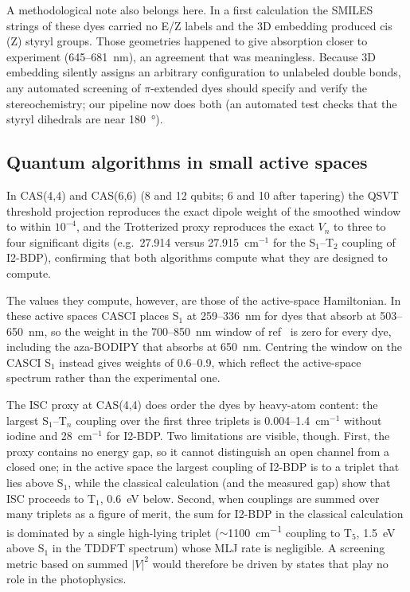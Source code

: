 \documentclass[journal=jpcafh,manuscript=article]{achemso}
\begin{document}
A methodological note also belongs here. In a first calculation the SMILES strings of these dyes
carried no E/Z labels and the 3D embedding produced cis (Z) styryl groups. Those geometries happened
to give absorption closer to experiment (645--681~nm), an agreement that was meaningless. Because 3D embedding silently assigns an arbitrary configuration to unlabeled double bonds,
any automated screening of $\pi$-extended dyes should specify and verify the stereochemistry; our
pipeline now does both (an automated test checks that the styryl dihedrals are near
\SI{180}{\degree}).

\subsection{Quantum algorithms in small active spaces}

In CAS(4,4) and CAS(6,6) (8 and 12 qubits; 6 and 10 after tapering) the QSVT threshold projection
reproduces the exact dipole weight of the smoothed window to within $10^{-4}$, and the Trotterized
proxy reproduces the exact $V_n$ to three to four significant digits (e.g.\ 27.914 versus
27.915~cm$^{-1}$ for the S$_1$--T$_2$ coupling of I2-BDP), confirming that both algorithms compute
what they are designed to compute.

The values they compute, however, are those of the active-space Hamiltonian. In these active spaces
CASCI places S$_1$ at 259--336~nm for dyes that absorb at 503--650~nm, so the weight in the
700--850~nm window of ref~ is zero for every dye, including the aza-BODIPY that
absorbs at 650~nm. Centring the window on the CASCI S$_1$ instead gives weights of 0.6--0.9, which
reflect the active-space spectrum rather than the experimental one.

The ISC proxy at CAS(4,4) does order the dyes by heavy-atom content: the largest S$_1$--T$_n$
coupling over the first three triplets is 0.004--1.4~cm$^{-1}$ without iodine and 28~cm$^{-1}$ for
I2-BDP. Two limitations are visible, though. First, the proxy contains no energy gap, so it cannot
distinguish an open channel from a closed one; in the active space the largest coupling of I2-BDP
is to a triplet that lies above S$_1$, while the classical calculation (and the measured gap) show
that ISC proceeds to T$_1$, 0.6~eV below. Second, when couplings are summed over many triplets as a
figure of merit, the sum for I2-BDP in the classical calculation is dominated by a single high-lying triplet
($\sim$\SI{1100}{cm^{-1}} coupling to T$_5$, 1.5~eV above S$_1$ in the TDDFT spectrum) whose MLJ rate is negligible.
A screening metric based on summed $\lvert V\rvert^2$ would therefore be driven by states that
play no role in the photophysics.
\end{document}
